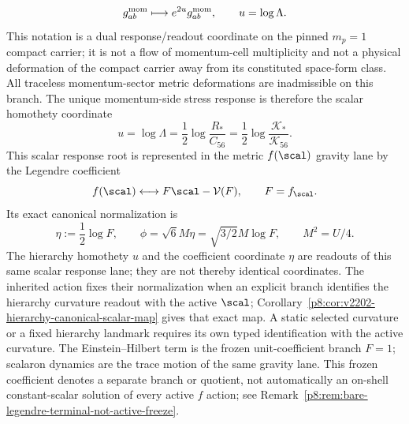 \documentclass[12pt,a4paper]{article}
\begin{document}
\begin{theorem}
\begin{equation}
\label{p8:eq:momentum-homothety-mode}
    g^{\rm mom}_{ab}\longmapsto e^{2u}g^{\rm mom}_{ab},
    \qquad
    u=\log\Lambda .
\end{equation}
This notation is a dual response/readout coordinate on the pinned
\(m_p=1\) compact carrier; it is not a flow of momentum-cell multiplicity and
not a physical deformation of the compact carrier away from its constituted
space-form class.  All traceless momentum-sector metric deformations are
inadmissible on this branch.  The unique momentum-side stress response is
therefore the scalar homothety coordinate
\begin{equation}
\label{p8:eq:scalaron-u-hierarchy-coordinate}
    u=\log\Lambda
    =\frac12\log\frac{R_*}{C_{56}}
    =\frac12\log\frac{\mathcal K_*}{\mathcal K_{56}} .
\end{equation}
This scalar response root is represented in the metric \(f(\scal)\)
gravity lane by the Legendre coefficient
\begin{equation}
\label{p8:eq:scalaron-as-eh-coefficient}
    f(\scal)\longleftrightarrow F\scal-\mathcal V(F),
    \qquad F=f_{\scal}.
\end{equation}
Its exact canonical normalization is
\begin{equation}
\label{p8:eq:chi-u-identification}
    \eta:=\frac12\log F,
    \qquad \phi=\sqrt6M\eta=\sqrt{3/2}M\log F,
    \qquad M^2=U/4.
\end{equation}
The hierarchy homothety \(u\) and the coefficient coordinate \(\eta\) are
readouts of this same scalar response lane; they are not thereby identical
coordinates.  The inherited action fixes their normalization when an
explicit branch identifies the hierarchy curvature readout with the active
\(\scal\); Corollary~\ref{p8:cor:v2202-hierarchy-canonical-scalar-map}
gives that exact map.  A static selected curvature or a fixed hierarchy
landmark requires its own typed identification with the active curvature.
The Einstein--Hilbert term is the frozen unit-coefficient branch \(F=1\);
scalaron dynamics are the trace motion of the same gravity lane.  This
frozen coefficient denotes a separate branch or quotient, not automatically
an on-shell constant-scalar solution of every active \(f\) action; see
Remark~\ref{p8:rem:bare-legendre-terminal-not-active-freeze}.
\end{theorem}
\end{document}
